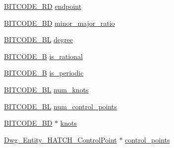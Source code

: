 \begin{DoxyCompactItemize}
\item 
\hyperlink{dwg_8h_a1d23a9bc9a02453876b244dc6706f6a6}{\-B\-I\-T\-C\-O\-D\-E\-\_\-R\-D} \hyperlink{struct__dwg__entity__HATCH__pathseg_a939655b1483d1fbdd310b1d741e60482}{endpoint}
\item 
\hyperlink{dwg_8h_a3c1e6781466b74ba07785d57da70ed97}{\-B\-I\-T\-C\-O\-D\-E\-\_\-\-B\-D} \hyperlink{struct__dwg__entity__HATCH__pathseg_a97157b4f3de004b341cd6e686936e598}{minor\-\_\-major\-\_\-ratio}
\item 
\hyperlink{dwg_8h_aebd5f127038868cbabc3d55d91da776c}{\-B\-I\-T\-C\-O\-D\-E\-\_\-\-B\-L} \hyperlink{struct__dwg__entity__HATCH__pathseg_a7ce39517083e00cae6e469bda2b10a56}{degree}
\item 
\hyperlink{dwg_8h_ab533b1f62d9086749e3bb5b67e9f224e}{\-B\-I\-T\-C\-O\-D\-E\-\_\-\-B} \hyperlink{struct__dwg__entity__HATCH__pathseg_a58c03dd9cd632104c80d527fe20fc8ad}{is\-\_\-rational}
\item 
\hyperlink{dwg_8h_ab533b1f62d9086749e3bb5b67e9f224e}{\-B\-I\-T\-C\-O\-D\-E\-\_\-\-B} \hyperlink{struct__dwg__entity__HATCH__pathseg_a642fff29131f278558567042e8449463}{is\-\_\-periodic}
\item 
\hyperlink{dwg_8h_aebd5f127038868cbabc3d55d91da776c}{\-B\-I\-T\-C\-O\-D\-E\-\_\-\-B\-L} \hyperlink{struct__dwg__entity__HATCH__pathseg_ab3b974e57ee77ca52c2e968c4e971afe}{num\-\_\-knots}
\item 
\hyperlink{dwg_8h_aebd5f127038868cbabc3d55d91da776c}{\-B\-I\-T\-C\-O\-D\-E\-\_\-\-B\-L} \hyperlink{struct__dwg__entity__HATCH__pathseg_a89c03c8cf51e2720dbfc3fc7abe19c0b}{num\-\_\-control\-\_\-points}
\item 
\hyperlink{dwg_8h_a3c1e6781466b74ba07785d57da70ed97}{\-B\-I\-T\-C\-O\-D\-E\-\_\-\-B\-D} $\ast$ \hyperlink{struct__dwg__entity__HATCH__pathseg_a0e855bf35b783f0e0e3abdde111c64b5}{knots}
\item 
\hyperlink{dwg_8h_a1571fcf6da2189c38f9149eb28cffb21}{\-Dwg\-\_\-\-Entity\-\_\-\-H\-A\-T\-C\-H\-\_\-\-Control\-Point} $\ast$ \hyperlink{struct__dwg__entity__HATCH__pathseg_a9a27afb49b82f1ea4b20a9099ece444d}{control\-\_\-points}
\end{DoxyCompactItemize}


